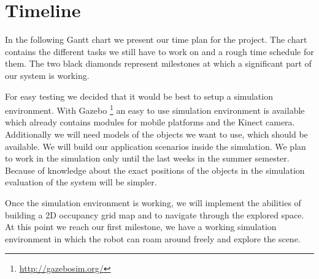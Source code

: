 \documentclass[a4paper,11pt,english]{article}
\begin{document}
\section{Timeline}
\label{timeline}

In the following Gantt chart we present our time plan for the project.
The chart contains the different tasks we still have to work on and a rough time schedule for them.
The two black diamonds represent milestones at which a significant part of our system is working.\medskip

\noindent{}

For easy testing we decided that it would be best to setup a simulation environment.
With Gazebo \footnote{\url{http://gazebosim.org/}} an easy to use simulation environment is available which already contains modules for mobile platforms and the Kinect camera.
Additionally we will need models of the objects we want to use, which should be available.
We will build our application scenarios inside the simulation.
We plan to work in the simulation only until the last weeks in the summer semester.
Because of knowledge about the exact positions of the objects in the simulation evaluation of the system will be simpler.

Once the simulation environment is working, we will implement the abilities of building a 2D occupancy grid map and to navigate through the explored space.
At this point we reach our first milestone, we have a working simulation environment in which the robot can roam around freely and explore the scene.
\end{document}

